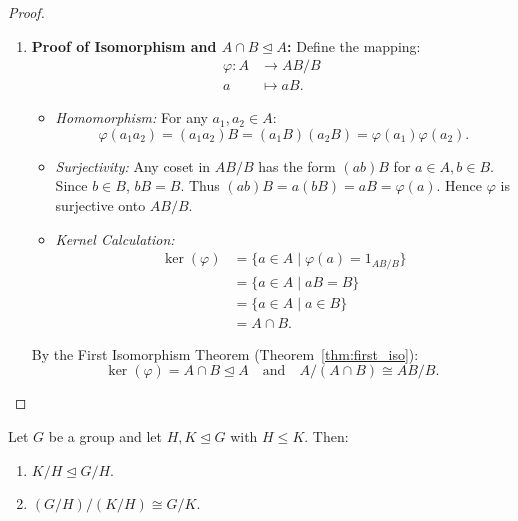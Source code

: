 \begin{proof}
\begin{enumerate}[label=\textbf{(\roman*)}, leftmargin=*, itemsep=8pt]
    \item \textbf{Proof of Isomorphism and $A \cap B \trianglelefteq A$:}
    Define the mapping:
    \begin{align*}
    \varphi: A &\longrightarrow AB/B \\
    a &\longmapsto aB.
    \end{align*}
    \begin{itemize}[leftmargin=1.5em, itemsep=4pt]
        \item \emph{Homomorphism:} For any $a_1, a_2 \in A$:
        \begin{equation*}
        \varphi(a_1 a_2) = (a_1 a_2)B = (a_1 B)(a_2 B) = \varphi(a_1)\varphi(a_2).
        \end{equation*}
        \item \emph{Surjectivity:} Any coset in $AB/B$ has the form $(ab)B$ for $a \in A, b \in B$.
        Since $b \in B$, $bB = B$.
        Thus $(ab)B = a(bB) = aB = \varphi(a)$.
        Hence $\varphi$ is surjective onto $AB/B$.
        \item \emph{Kernel Calculation:}
        \begin{align*}
        \ker(\varphi) &= \{ a \in A \mid \varphi(a) = 1_{AB/B} \} \\
        &= \{ a \in A \mid aB = B \} \\
        &= \{ a \in A \mid a \in B \} \\
        &= A \cap B.
        \end{align*}
    \end{itemize}
    By the First Isomorphism Theorem (Theorem~\ref{thm:first_iso}):
    \begin{equation*}
    \ker(\varphi) = A \cap B \trianglelefteq A \quad \text{and} \quad A / (A \cap B) \cong AB / B.
    \end{equation*}
\end{enumerate}
\end{proof}

\begin{theorem}
\label{thm:third_iso}
Let $G$ be a group and let $H, K \trianglelefteq G$ with $H \le K$. Then:
\begin{enumerate}[label=\textbf{(\roman*)}, leftmargin=*, itemsep=4pt]
    \item $K/H \trianglelefteq G/H$.
    \item $(G/H) / (K/H) \cong G/K$.
\end{enumerate}
\end{theorem}

